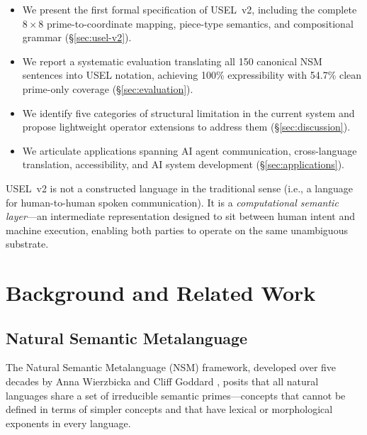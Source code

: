 \documentclass[11pt,a4paper]{article}
\begin{document}
\begin{itemize}[nosep]
    \item We present the first formal specification of USEL~v2, including the complete $8 \times 8$ prime-to-coordinate mapping, piece-type semantics, and compositional grammar (\S\ref{sec:usel-v2}).
    \item We report a systematic evaluation translating all 150 canonical NSM sentences \citep{goddard2017canonical} into USEL notation, achieving 100\% expressibility with 54.7\% clean prime-only coverage (\S\ref{sec:evaluation}).
    \item We identify five categories of structural limitation in the current system and propose lightweight operator extensions to address them (\S\ref{sec:discussion}).
    \item We articulate applications spanning AI agent communication, cross-language translation, accessibility, and AI system development (\S\ref{sec:applications}).
\end{itemize}

USEL~v2 is not a constructed language in the traditional sense (i.e., a language for human-to-human spoken communication). It is a \emph{computational semantic layer}---an intermediate representation designed to sit between human intent and machine execution, enabling both parties to operate on the same unambiguous substrate.

\section{Background and Related Work}
\label{sec:background}

\subsection{Natural Semantic Metalanguage}
\label{sec:nsm}

The Natural Semantic Metalanguage (NSM) framework, developed over five decades by Anna Wierzbicka and Cliff Goddard \citep{wierzbicka1972semantic, wierzbicka1996semantics, goddard2002meaning, goddard2014words}, posits that all natural languages share a set of irreducible semantic primes---concepts that cannot be defined in terms of simpler concepts and that have lexical or morphological exponents in every language.
\end{document}
